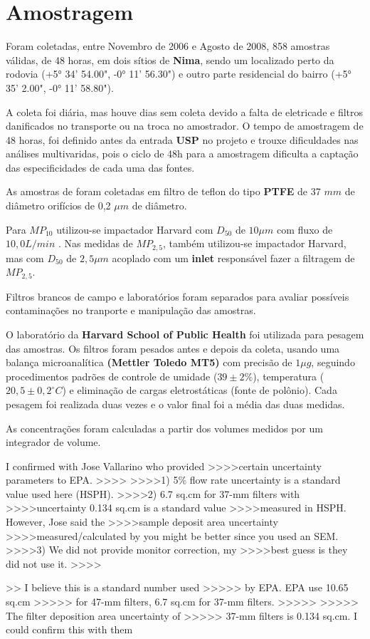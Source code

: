 \section{Amostragem}

Foram coletadas, entre Novembro de 2006 e Agosto de 2008, 858 amostras válidas, 
de 48 horas, em dois sítios de \textbf{Nima}, sendo um localizado perto da rodovia
(+5° 34' 54.00", -0° 11' 56.30") e outro parte residencial do 
bairro (+5° 35' 2.00", -0° 11' 58.80").

A coleta foi diária, mas houve dias sem coleta devido a falta de eletricade e
filtros danificados no transporte ou na troca no amostrador. 
O tempo de amostragem de 48 horas, foi definido antes da entrada \textbf{USP} 
no projeto e trouxe dificuldades nas análises multivaridas, pois o
ciclo de 48h para a amostragem dificulta a captação das especificidades 
de cada uma das fontes.

As amostras de foram coletadas em filtro de teflon do tipo 
\textbf{PTFE} de 37 $mm$ de diâmetro orifícios de 0,2 $\mu m$ de diâmetro. 

Para $MP_{10}$ utilizou-se impactador Harvard com $D_{50}$ de $10 \mu m$ 
com fluxo de $10,0 L/min$ \citep{marple1987}. 
Nas medidas de $MP_{2,5}$, também utilizou-se impactador Harvard, 
mas com $D_{50}$ de $2,5 \mu m$ acoplado com um \textbf{inlet} 
responsável fazer a filtragem de $MP_{2,5}$.

Filtros brancos de campo e laboratórios foram separados para avaliar 
possíveis contaminações no tranporte e manipulação das amostras. 

O laboratório da \textbf{Harvard School of Public Health} foi
utilizada para pesagem das amostras.
Os filtros foram pesados antes e depois da coleta, usando uma balança 
microanalítica \textbf{(Mettler Toledo MT5)} com precisão de $1 \mu g$, 
seguindo procedimentos padrões de controle de umidade ($39 \pm 2 \%$), 
temperatura ($20,5 \pm 0,2 ^{\circ} C$) e eliminação de cargas eletrostáticas 
(fonte de polônio).
Cada pesagem foi realizada duas vezes e o valor final foi a média das 
duas medidas.

As concentrações foram calculadas a partir dos volumes 
medidos por um integrador de volume.


I confirmed with Jose Vallarino who provided
>>>>certain uncertainty parameters to EPA.
>>>>
>>>>1) 5\% flow rate uncertainty is a standard value used here (HSPH).
>>>>2) 6.7 sq.cm for 37-mm filters with
>>>>uncertainty 0.134 sq.cm is a standard value
>>>>measured in HSPH. However, Jose said the
>>>>sample deposit area uncertainty
>>>>measured/calculated by you might be better since you used an SEM.
>>>>3) We did not provide monitor correction, my
>>>>best guess is they did not use it.
>>>> 

>>  I believe this is a standard number used
>>>>> by EPA. EPA use 10.65 sq.cm
>>>>> for 47-mm filters, 6.7 sq.cm for 37-mm filters.
>>>>>
>>>>>  The filter deposition area uncertainty of
>>>>> 37-mm filters is 0.134 sq.cm. I could confirm this with them 



